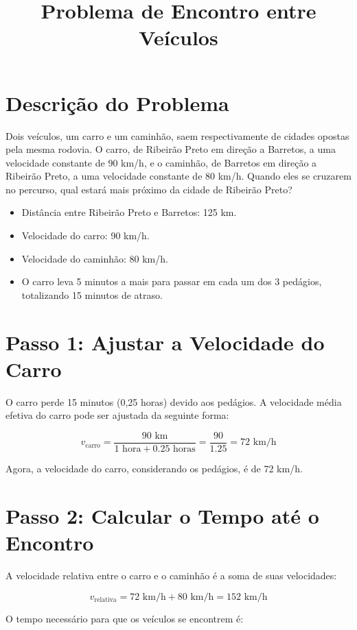 \documentclass{article}
\begin{document}
\title{Problema de Encontro entre Veículos}
\author{}
\date{}
\maketitle

\section*{Descrição do Problema}
Dois veículos, um carro e um caminhão, saem respectivamente de cidades opostas pela mesma rodovia. O carro, de Ribeirão Preto em direção a Barretos, a uma velocidade constante de 90 km/h, e o caminhão, de Barretos em direção a Ribeirão Preto, a uma velocidade constante de 80 km/h. Quando eles se cruzarem no percurso, qual estará mais próximo da cidade de Ribeirão Preto?

\begin{itemize}
    \item Distância entre Ribeirão Preto e Barretos: 125 km.
    \item Velocidade do carro: 90 km/h.
    \item Velocidade do caminhão: 80 km/h.
    \item O carro leva 5 minutos a mais para passar em cada um dos 3 pedágios, totalizando 15 minutos de atraso.
\end{itemize}

\section*{Passo 1: Ajustar a Velocidade do Carro}
O carro perde 15 minutos (0,25 horas) devido aos pedágios. A velocidade média efetiva do carro pode ser ajustada da seguinte forma:

\[
v_{\text{carro}} = \frac{90 \text{ km}}{1 \text{ hora} + 0.25 \text{ horas}} = \frac{90}{1.25} = 72 \text{ km/h}
\]

Agora, a velocidade do carro, considerando os pedágios, é de 72 km/h.

\section*{Passo 2: Calcular o Tempo até o Encontro}
A velocidade relativa entre o carro e o caminhão é a soma de suas velocidades:

\[
v_{\text{relativa}} = 72 \text{ km/h} + 80 \text{ km/h} = 152 \text{ km/h}
\]

O tempo necessário para que os veículos se encontrem é:
\end{document}
